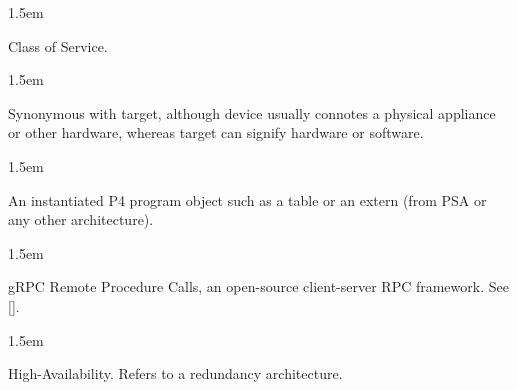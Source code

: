 \documentclass[11pt]{article}
\begin{document}
{\begin{mddefinitions}

\begin{mdbmarginx}{}{}{}{1.5em}%
\begin{mddefdata}%
Class of Service.
\end{mddefdata}%
\end{mdbmarginx}%


\begin{mdbmarginx}{}{}{}{1.5em}%
\begin{mddefdata}%
Synonymous with target, although device usually connotes a physical
appliance or other hardware, whereas target can signify hardware or
software.
\end{mddefdata}%
\end{mdbmarginx}%


\begin{mdbmarginx}{}{}{}{1.5em}%
\begin{mddefdata}%
An instantiated P4 program object such as a table or an extern (from PSA or
any other architecture).
\end{mddefdata}%
\end{mdbmarginx}%


\begin{mdbmarginx}{}{}{}{1.5em}%
\begin{mddefdata}%
gRPC Remote Procedure Calls, an open-source client-server RPC framework. See
[].
\end{mddefdata}%
\end{mdbmarginx}%


\begin{mdbmarginx}{}{}{}{1.5em}%
\begin{mddefdata}%
High-Availability. Refers to a redundancy architecture.
\end{mddefdata}%
\end{mdbmarginx}%



\end{mddefinitions}}
\end{document}
